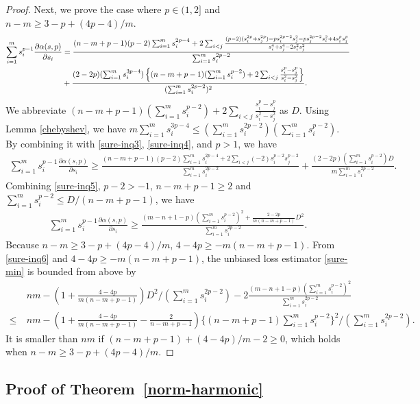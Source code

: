 \documentclass[11pt, a4paper]{article}
\theoremstyle{remark}
\begin{document}
\begin{proof}
Next, we prove the case where $p\in(1,2]$ and $n-m\ge 3-p+(4p-4)/m$.
\begin{align}
    \sum_{i=1}^m s_i^{p-1}\frac{\partial\alpha( s,p)}{\partial s_i}\notag &=\frac{(n-m+p-1)(p-2)\sum_{i=1}^m s_i^{2p-4}+2\sum_{i<j}\frac{(p-2)( s_i^{2p}+ s_j^{2p})-p s_i^{2p-2} s_j^2-p s_j^{2p-2} s_i^2+4 s_i^p s_j^p}{ s_i^4+ s_j^4-2 s_i^2 s_j^2}}{\sum_{i=1}^m s_i^{2p-2}}\notag \\
    &+\frac{(2-2p)(\sum_{i=1}^m s_i^{3p-4})\left\{(n-m+p-1)(\sum_{i=1}^m s_i^{p-2})+2\sum_{i<j}\frac{ s_i^p- s_j^p}{ s_i^2- s_j^2}\right\}}{(\sum_{i=1}^m s_i^{2p-2})^2}. \label{sure-inq4}
    \end{align}
We abbreviate $(n-m+p-1)(\sum_{i=1}^m s_i^{p-2})+2\sum_{i<j}\frac{ s_i^p- s_j^p}{ s_i^2- s_j^2}$ as $D$. Using Lemma \ref{chebyshev}, we have $m\sum_{i=1}^m s_i^{3p-4}\le (\sum_{i=1}^m s_i^{2p-2})(\sum_{i=1}^m s_i^{p-2})$. By combining it with \eqref{sure-inq3}, \eqref{sure-inq4}, and $p>1$, we have
\begin{align}
    \sum_{i=1}^m s_i^{p-1}\frac{\partial\alpha( s,p)}{\partial s_i}\ge\frac{(n-m+p-1)(p-2)\sum_{i=1}^m s_i^{2p-4}+2\sum_{i<j}(-
    2) s_i^{p-2} s_j^{p-2}}{\sum_{i=1}^m s_i^{2p-2}}
    +\frac{(2-2p)(\sum_{i=1}^m s_i^{p-2})D}{m\sum_{i=1}^m s_i^{2p-2}}. \label{sure-inq5}
    \end{align}
Combining \eqref{sure-inq5}, $p-2>-1$, $n-m+p-1\ge2$ and $\sum_{i=1}^m s_i^{p-2}\le D/(n-m+p-1)$, we have
\begin{align}
    \sum_{i=1}^m s_i^{p-1}\frac{\partial\alpha( s,p)}{\partial s_i} \ge\frac{(m-n+1-p)(\sum_{i=1}^m s_i^{p-2})^2
    +\frac{2-2p}{m(n-m+p-1)}D^2}{\sum_{i=1}^m s_i^{2p-2}}. \label{sure-inq6}
    \end{align}
Because $n-m\ge 3-p+(4p-4)/m$, $4-4p\ge-m(n-m+p-1)$. From \eqref{sure-inq6} and $4-4p\ge-m(n-m+p-1)$, the unbiased loss estimator \eqref{sure-min} is bounded from above by
\begin{align*}
   &nm-\left(1+\frac{4-4p}{m(n-m+p-1)}\right)D^2/(\sum_{i=1}^m s_i^{2p-2})-2\frac{(m-n+1-p)(\sum_{i=1}^m s_i^{p-2})^2}{\sum_{i=1}^m s_i^{2p-2}} \\
   \le\ & nm-\left(1+\frac{4-4p}{m(n-m+p-1)}-\frac{2}{n-m+p-1}\right)\Big\{(n-m+p-1)\sum_{i=1}^m s_i^{p-2}\Big\}^2/(\sum_{i=1}^m s_i^{2p-2}) .
\end{align*}
It is smaller than $nm$ if $(n-m+p-1)+(4-4p)/m-2\ge0$, which holds when $n-m\ge 3-p+(4p-4)/m$.
\end{proof}

\subsection{Proof of Theorem~\ref{norm-harmonic}}
\end{document}

